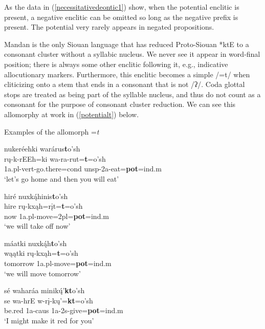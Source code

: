 As the data in (\ref{necessitativedeontic1}) show, when the potential enclitic is present, a negative enclitic can be omitted so long as the negative prefix is present. The potential very rarely appears in negated propositions. 


Mandan is the only Siouan language that has reduced Proto-Siouan *ktE to a consonant cluster without a syllabic nucleus. We never see it appear in word-final position; there is always some other enclitic following it, e.g., indicative allocutionary markers. Furthermore, this enclitic becomes a simple /=t/ when cliticizing onto a stem that ends in a consonant that is not /ʔ/. Coda glottal stops are treated as being part of the syllable nucleus, and thus do not count as a consonant for the purpose of consonant cluster reduction. We can see this allomorphy at work in (\ref{potentialt}) below.

\begin{exe}

\item\label{potentialt} Examples of the allomorph =\textit{t}

	\begin{xlist}
	

	\item\label{potentialt1}
	\glll nukeréehki warárus\textbf{t}o'sh\\
	rų-k-rEEh=ki wa-ra-rut=\textbf{t}=o'sh\\
	1a.pl-vert-\textnormal{go.there}=cond unsp-2a-\textnormal{eat}=\textbf{pot}=ind.m\\
	\glt `let's go home and then you will eat' \citep[87]{hollow1973a}

	\item\label{potentialt2}
	\glll hiré nuxką́hinis\textbf{t}o'sh\\
	hire rų-kxąh=rįt=\textbf{t}=o'sh\\
	\textnormal{now} 1a.pl-\textnormal{move}=2pl=\textbf{pot}=ind.m\\
	\glt `we will take off now' \citep[82]{hollow1973b}

	\item\label{potentialt3}
	\glll máatki nuxką́h\textbf{t}o'sh\\
	wąątki rų-kxąh=\textbf{t}=o'sh\\
	\textnormal{tomorrow} 1a.pl-\textnormal{move}=\textbf{pot}=ind.m\\
	\glt `we will move tomorrow' \citep[48]{hollow1973b}

	\item\label{potentialt4}
	\glll sé waharáa minikų́'\textbf{kt}o'sh\\
	se wa-hrE w-rį-kų'=\textbf{kt}=o'sh\\
	\textnormal{be.red} 1a-caus 1a-2s-\textnormal{give}=\textbf{pot}=ind.m\\
	\glt `I might make it red for you' \citep[454]{hollow1970}

	\end{xlist}
	
\end{exe}

